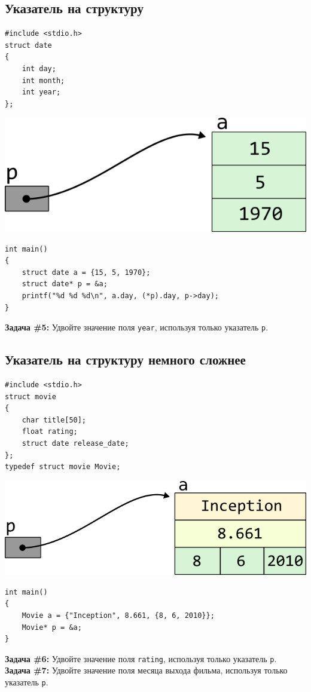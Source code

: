 \documentclass{article}
\begin{document}
\subsection*{Указатель на структуру}
\begin{multicols}{2}
\begin{lstlisting}
#include <stdio.h>
struct date
{
	int day;
	int month;
	int year;
};
\end{lstlisting}
\columnbreak
\includegraphics[scale=1]{../../images/pointer_schemes/pointer_to_struct_date.png}
\end{multicols}
\vspace{-5ex}
\begin{lstlisting}
int main()
{
	struct date a = {15, 5, 1970};
	struct date* p = &a;
	printf("%d %d %d\n", a.day, (*p).day, p->day);
}
\end{lstlisting}
\textbf{Задача \#5:} Удвойте значение поля \texttt{year}, используя только указатель \texttt{p}.

\subsection*{Указатель на структуру немного сложнее}
\begin{multicols}{2}
\begin{lstlisting}
#include <stdio.h>
struct movie
{
	char title[50];
	float rating;
	struct date release_date;
};
typedef struct movie Movie;
\end{lstlisting}
\columnbreak
\begin{center}
\includegraphics[scale=1]{../../images/pointer_schemes/pointer_to_struct_movie.png}
\end{center}
\end{multicols}
\begin{lstlisting}
int main()
{
	Movie a = {"Inception", 8.661, {8, 6, 2010}};
	Movie* p = &a;
}
\end{lstlisting}
\textbf{Задача \#6:} Удвойте значение поля \texttt{rating}, используя только указатель \texttt{p}.\\
\textbf{Задача \#7:} Удвойте значение поля месяца выхода фильма, используя только указатель \texttt{p}.
\end{document}
